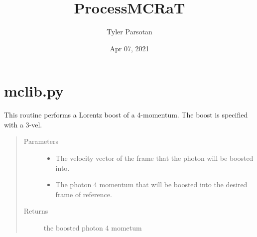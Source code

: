 \documentclass[letterpaper,10pt,english]{sphinxmanual}
\title{ProcessMCRaT}
\date{Apr 07, 2021}
\author{Tyler Parsotan}
\begin{document}
\pagestyle{empty}
\sphinxmaketitle
\pagestyle{plain}
\sphinxtableofcontents
\pagestyle{normal}
\label{\detokenize{index::doc}}



\chapter{mclib.py}
\label{\detokenize{mclib:module-mclib}}\label{\detokenize{mclib:mclib-py}}\label{\detokenize{mclib::doc}}

\begin{fulllineitems}
\label{\detokenize{mclib:mclib.Lorentz_Boost}}
This routine performs a Lorentz boost of a 4-momentum. The boost is specified with a 3-vel.
\begin{quote}\begin{description}
\item[{Parameters}] \leavevmode\begin{itemize}
\item {} 
 \textendash{} The velocity vector of the frame that the photon will be boosted into.

\item {} 
 \textendash{} The photon 4 momentum that will be boosted into the desired frame of reference.

\end{itemize}

\item[{Returns}] \leavevmode
the boosted photon 4 mometum

\end{description}\end{quote}

\end{fulllineitems}

\end{document}
